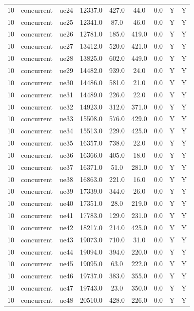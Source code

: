 \begin{table}[ht]
\begin{tabular}{|c|c|c|c|c|c|c|c|c|}
10 & concurrent & ue24 & 12337.0 & 427.0 & 44.0 & 0.0 & Y & Y \\
10 & concurrent & ue25 & 12341.0 & 87.0 & 46.0 & 0.0 & Y & Y \\
10 & concurrent & ue26 & 12781.0 & 185.0 & 419.0 & 0.0 & Y & Y \\
10 & concurrent & ue27 & 13412.0 & 520.0 & 421.0 & 0.0 & Y & Y \\
10 & concurrent & ue28 & 13825.0 & 602.0 & 449.0 & 0.0 & Y & Y \\
10 & concurrent & ue29 & 14482.0 & 939.0 & 24.0 & 0.0 & Y & Y \\
10 & concurrent & ue30 & 14486.0 & 581.0 & 21.0 & 0.0 & Y & Y \\
10 & concurrent & ue31 & 14489.0 & 226.0 & 22.0 & 0.0 & Y & Y \\
10 & concurrent & ue32 & 14923.0 & 312.0 & 371.0 & 0.0 & Y & Y \\
10 & concurrent & ue33 & 15508.0 & 576.0 & 429.0 & 0.0 & Y & Y \\
10 & concurrent & ue34 & 15513.0 & 229.0 & 425.0 & 0.0 & Y & Y \\
10 & concurrent & ue35 & 16357.0 & 738.0 & 22.0 & 0.0 & Y & Y \\
10 & concurrent & ue36 & 16366.0 & 405.0 & 18.0 & 0.0 & Y & Y \\
10 & concurrent & ue37 & 16371.0 & 51.0 & 281.0 & 0.0 & Y & Y \\
10 & concurrent & ue38 & 16863.0 & 221.0 & 16.0 & 0.0 & Y & Y \\
10 & concurrent & ue39 & 17339.0 & 344.0 & 26.0 & 0.0 & Y & Y \\
10 & concurrent & ue40 & 17351.0 & 28.0 & 219.0 & 0.0 & Y & Y \\
10 & concurrent & ue41 & 17783.0 & 129.0 & 231.0 & 0.0 & Y & Y \\
10 & concurrent & ue42 & 18217.0 & 214.0 & 425.0 & 0.0 & Y & Y \\
10 & concurrent & ue43 & 19073.0 & 710.0 & 31.0 & 0.0 & Y & Y \\
10 & concurrent & ue44 & 19094.0 & 394.0 & 220.0 & 0.0 & Y & Y \\
10 & concurrent & ue45 & 19095.0 & 63.0 & 222.0 & 0.0 & Y & Y \\
10 & concurrent & ue46 & 19737.0 & 383.0 & 355.0 & 0.0 & Y & Y \\
10 & concurrent & ue47 & 19743.0 & 23.0 & 350.0 & 0.0 & Y & Y \\
10 & concurrent & ue48 & 20510.0 & 428.0 & 226.0 & 0.0 & Y & Y \\

\end{tabular}
\end{table}
